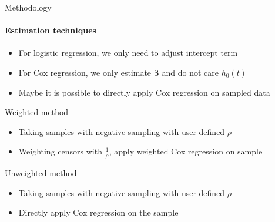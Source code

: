 \documentclass{beamer}
\newcommand{\bbeta}{\bm{\beta}}
\begin{document}
\begin{frame}{Methodology}
    \framesubtitle{Estimation techniques}
    \begin{itemize}
        \item For logistic regression, we only need to adjust intercept term
        \item For Cox regression, we only estimate $\bbeta$ and do not care $h_0(t)$
        \item Maybe it is possible to directly apply Cox regression on sampled data
    \end{itemize}
    \begin{exampleblock}{Weighted method}
        \begin{itemize}
            \item Taking samples with negative sampling with user-defined $\rho$
            \item Weighting censors with $\frac{1}{\rho}$, apply weighted Cox regression on sample
        \end{itemize}
    \end{exampleblock}
    \begin{exampleblock}{Unweighted method}
        \begin{itemize}
            \item Taking samples with negative sampling with user-defined $\rho$
            \item Directly apply Cox regression on the sample
        \end{itemize}
    \end{exampleblock}
\end{frame}
\end{document}
